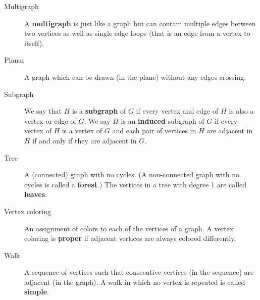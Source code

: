 \documentclass[12pt,]{book}
\newcommand{\terminology}[1]{\textbf{#1}}
\theoremstyle{plain}
\theoremstyle{definition}
\theoremstyle{definition}
\theoremstyle{definition}
\numberwithin{equation}{chapter}
\begin{document}
\begin{assemblage}
\begin{description}
\item[{Multigraph}]\hypertarget{li-712}{}\hypertarget{p-1578}{}%
 A \terminology{multigraph} is just like a graph but can contain multiple edges between two vertices as well as single edge loops (that is an edge from a vertex to itself).%
\item[{Planar}]\hypertarget{li-713}{}\hypertarget{p-1579}{}%
 A graph which can be drawn (in the plane) without any edges crossing.%
\item[{Subgraph}]\hypertarget{li-714}{}\hypertarget{p-1580}{}%
 We say that \(H\) is a \terminology{subgraph} of \(G\) if every vertex and edge of \(H\) is also a vertex or edge of \(G\). We say \(H\) is an \terminology{induced} subgraph of \(G\) if every vertex of \(H\) is a vertex of \(G\) and each pair of vertices in \(H\) are adjacent in \(H\) if and only if they are adjacent in \(G\).%
\item[{Tree}]\hypertarget{li-715}{}\hypertarget{p-1581}{}%
 A (connected) graph with no cycles. (A non-connected graph with no cycles is called a \terminology{forest}.) The vertices in a tree with degree 1 are called \terminology{leaves}.%
\item[{Vertex coloring}]\hypertarget{li-716}{}\hypertarget{p-1582}{}%
 An assignment of colors to each of the vertices of a graph. A vertex coloring is \terminology{proper} if adjacent vertices are always colored differently.%
\item[{Walk}]\hypertarget{li-717}{}\hypertarget{p-1583}{}%
 A sequence of vertices such that consecutive vertices (in the sequence) are adjacent (in the graph). A walk in which no vertex is repeated is called \terminology{simple}.%
\end{description}
%
\end{assemblage}
\typeout{************************************************}
\typeout{************************************************}
\end{document}
